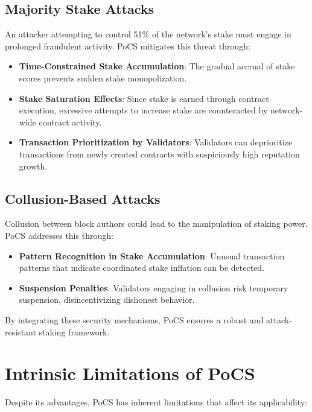 \documentclass{article}
\begin{document}
\subsection{Majority Stake Attacks}

An attacker attempting to control 51\% of the network’s stake must engage in prolonged fraudulent activity. PoCS mitigates this threat through:

\begin{itemize}
    \item \textbf{Time-Constrained Stake Accumulation}: The gradual accrual of stake scores prevents sudden stake monopolization.
    \item \textbf{Stake Saturation Effects}: Since stake is earned through contract execution, excessive attempts to increase stake are counteracted by network-wide contract activity.
    \item \textbf{Transaction Prioritization by Validators}: Validators can deprioritize transactions from newly created contracts with suspiciously high reputation growth.
\end{itemize}

\subsection{Collusion-Based Attacks}

Collusion between block authors could lead to the manipulation of staking power. PoCS addresses this through:

\begin{itemize}
    \item \textbf{Pattern Recognition in Stake Accumulation}: Unusual transaction patterns that indicate coordinated stake inflation can be detected.
    \item \textbf{Suspension Penalties}: Validators engaging in collusion risk temporary suspension, disincentivizing dishonest behavior.
\end{itemize}

By integrating these security mechanisms, PoCS ensures a robust and attack-resistant staking framework.

\section{Intrinsic Limitations of PoCS}

Despite its advantages, PoCS has inherent limitations that affect its applicability:
\end{document}
